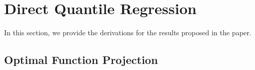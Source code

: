 \documentclass[twoside]{article} \usepackage{aistats2017}
\theoremstyle{definition}
\theoremstyle{theorem}
\newtheorem{theorem}{Theorem}[section]
\newcommand{\rv}[1]{{#1}}
\newcommand{\warn}[1]{{\color{red} #1}}
\newcommand{\hatmuX}{\hat{\mu}_{\rv{X}}}
\newcommand{\hatmuY}{\hat{\mu}_{\rv{Y}}}
\newcommand{\hatCxly}{\hat{C}_{\rv{X} | \rv{Y}}}
\begin{document}
%			
%		

\section{Direct Quantile Regression}
\label{sec:direct_quantile_regression}

	In this section, we provide the derivations for the results proposed in the paper.

	\subsection{Optimal Function Projection}
	\label{sec:direct_quantile_regression:optimal_function_projection}
\end{document}

